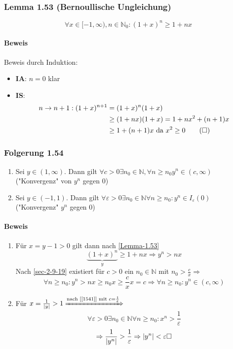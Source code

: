 \documentclass[a4paper]{scrartcl}
\DeclarePairedDelimiter\abs{\lvert}{\rvert}%
\DeclareMathOperator{\Forall}{\forall}%
\begin{document}
\subsubsection{Lemma 1.53 (Bernoullische Ungleichung)}
\label{sec-2-9-20}
\label{Lemma-1.53}
\[\Forall x\in [-1,\infty),n\in\mathbb{N}_0: (1 + x)^n \geq 1 + n x\]
\paragraph{Beweis}
\label{sec-2-9-20-1}
Beweis durch Induktion:
\begin{itemize}
\item \textbf{IA}: $n = 0$ klar
\item \textbf{IS}:
\begin{align}
n\to n + 1: (1 + x)^{n + 1} &= (1 + x)^n(1 + x) \\
&\geq (1 + n x) (1 + x) = 1 + nx^2 + (n + 1) x \\
&\geq 1 + (n + 1) x~\text{da $x^2 \geq 0$} \tag{\text{$\square$}}
\end{align}
\end{itemize}
\subsubsection{Folgerung 1.54}
\label{sec-2-9-21}
\begin{enumerate}
\item Sei $y\in(1,\infty)$. Dann gilt $\Forall c > 0 \exists n_0 \in \mathbb{N},\Forall n\geq n_0 y^n \in (c,\infty)$ ("Konvergenz" von $y^n$ gegen 0)
\item Sei $y \in (-1,1)$. Dann gilt $\Forall \varepsilon > 0\exists n_0 \in \mathbb{N}\Forall n\geq n_0:y^n \in I_\varepsilon (0)$ ("Konvergenz" $y^n$ gegen 0)
\end{enumerate}
\paragraph{Beweis}
\label{sec-2-9-21-1}
\begin{enumerate}
\item \label{1541} Für $x = y - 1 > 0$ gilt dann nach \ref{Lemma-1.53} \[\underbrace{(1 + x)^n}_y \geq 1 + n x \Rightarrow y^n > n x\]
        Nach \ref{sec-2-9-19} existiert für $c > 0$ ein $n_0 \in \mathbb{N}$ mit $n_0 > \frac{c}{x} \Rightarrow$
        \[\Forall n\geq n_0: y^n > n x \geq n_0 x \geq \frac{c}{x} x = c \Rightarrow \Forall n\geq n_0: y^n\in(c,\infty)\]
\item Für  $x = \frac{1}{\abs{y}} > 1 \xRightarrow{\text{nach [[1541]] mit } c = \frac{1}{\varepsilon}}$
        \[\Forall \varepsilon > 0\exists n_0\in\mathbb{N}\Forall n\geq n_0: x^n > \frac{1}{\varepsilon}\]
        \[\Rightarrow \frac{1}{\abs{y^n}} > \frac{1}{\varepsilon} \Rightarrow \abs{y^n} < \varepsilon \hfill \square\]
\end{enumerate}
\end{document}
